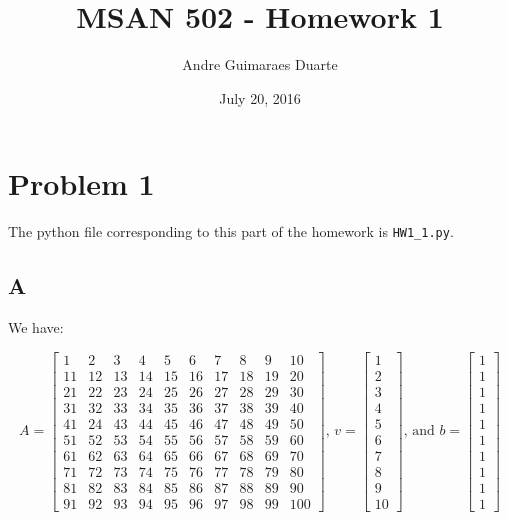 \documentclass[]{article}
\title{MSAN 502 - Homework 1}
\author{Andre Guimaraes Duarte}
\date{July 20, 2016}
\begin{document}
\maketitle

\section*{Problem 1}
The python file corresponding to this part of the homework is \texttt{HW1\_1.py}.

\subsection*{A}
We have:

\[
A= \left[ \begin{array}{cccccccccc}
  1 & 2 & 3 & 4 & 5 & 6 & 7 & 8 & 9 & 10\\
  11 & 12 & 13 & 14 & 15 & 16 & 17 & 18 & 19 & 20\\
  21 & 22 & 23 & 24 & 25 & 26 & 27 & 28 & 29 & 30\\
  31 & 32 & 33 & 34 & 35 & 36 & 37 & 38 & 39 & 40\\
  41 & 24 & 43 & 44 & 45 & 46 & 47 & 48 & 49 & 50\\
  51 & 52 & 53 & 54 & 55 & 56 & 57 & 58 & 59 & 60\\
  61 & 62 & 63 & 64 & 65 & 66 & 67 & 68 & 69 & 70\\
  71 & 72 & 73 & 74 & 75 & 76 & 77 & 78 & 79 & 80\\
  81 & 82 & 83 & 84 & 85 & 86 & 87 & 88 & 89 & 90\\
  91 & 92 & 93 & 94 & 95 & 96 & 97 & 98 & 99 & 100
\end{array} \right]
%
\text{, }v= \left[ \begin{array}{c}
  1\\
  2\\
  3\\
  4\\
  5\\
  6\\
  7\\
  8\\
  9\\
  10
\end{array} \right]
%
\text{, and }b= \left[ \begin{array}{c}
  1\\
  1\\
  1\\
  1\\
  1\\
  1\\
  1\\
  1\\
  1\\
  1
\end{array} \right]
\]
\end{document}
